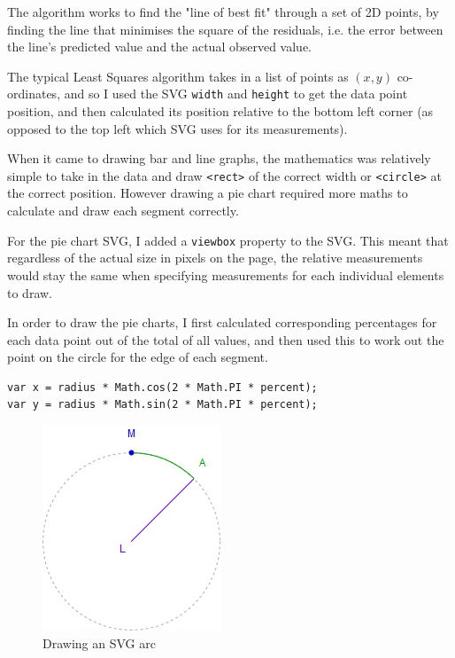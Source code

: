 \documentclass[ %
                    author={Aleena Baig},
                supervisor={Dr Simon Lock},
                    degree={BSc},
                     title={On Making Web Accessible Graphs},
                  subtitle={},
                      year={2019} ]{dissertation}
\begin{document}
The algorithm works to find the "line of best fit" through a set of 2D points, by finding the line that minimises the square of the residuals, i.e. the error between the line's predicted value and the actual observed value.

The typical Least Squares algorithm takes in a list of points as $(x,y)$ co-ordinates, and so I used the SVG \texttt{width} and \texttt{height} to get the data point position, and then calculated its position relative to the bottom left corner (as opposed to the top left which SVG uses for its measurements).

When it came to drawing bar and line graphs, the mathematics was relatively simple to take in the data and draw \texttt{<rect>} of the correct width or \texttt{<circle>} at the correct position. However drawing a pie chart required more maths to calculate and draw each segment correctly.

For the pie chart SVG, I added a \texttt{viewbox} property to the SVG. This meant that regardless of the actual size in pixels on the page, the relative measurements would stay the same when specifying measurements for each individual elements to draw.

In order to draw the pie charts, I first calculated corresponding percentages for each data point out of the total of all values, and then used this to work out the point on the circle for the edge of each segment.

\begin{lstlisting}
var x = radius * Math.cos(2 * Math.PI * percent);
var y = radius * Math.sin(2 * Math.PI * percent);
\end{lstlisting}

\begin{figure}
\includegraphics[width=0.9\linewidth]{images/DrawingArc.png} 
\caption{Drawing an SVG arc}
\end{figure}
\end{document}
